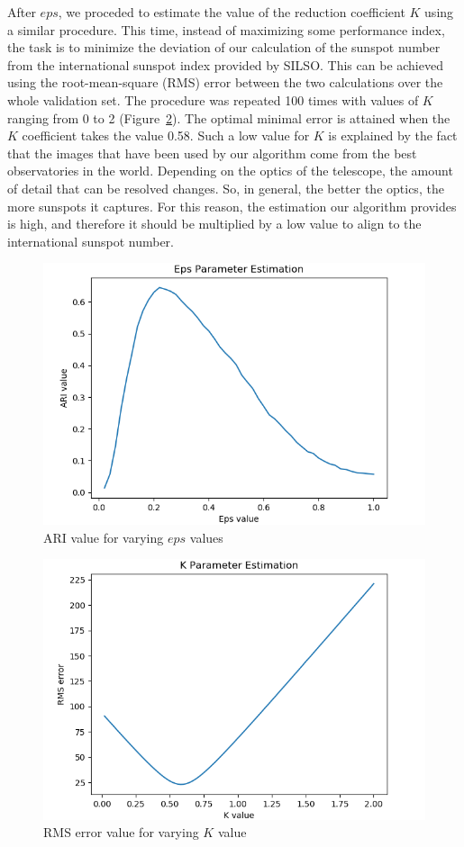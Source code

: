 \bigbreak
\noindent After $eps$, we proceded to estimate the value of the reduction coefficient $K$ using a similar procedure. This time, instead of maximizing some performance index, the task is to minimize the deviation of our calculation of the sunspot number from the international sunspot index provided by SILSO. This can be achieved using the root-mean-square (RMS) error between the two calculations over the whole validation set. The procedure was repeated 100 times with values of $K$ ranging from 0 to 2 (Figure~\ref{fig:k-rms}). The optimal minimal error is attained when the $K$ coefficient takes the value 0.58. Such a low value for $K$ is explained by the fact that the images that have been used by our algorithm come from the best observatories in the world. Depending on the optics of the telescope, the amount of detail that can be resolved changes. So, in general, the better the optics, the more sunspots it captures. For this reason, the estimation our algorithm provides is high, and therefore it should be multiplied by a low value to align to the international sunspot number.\clearpage
\begin{figure}[ht!]
  \centering
  \captionsetup{justification=centering}
  \includegraphics[width=\textwidth]{./pictures/eps-ari-copy}
  \caption{ARI value for varying $eps$ values}
  \label{fig:eps-ari}
\end{figure}
\begin{figure}[h!]
  \centering
  \captionsetup{justification=centering}
  \includegraphics[width=\textwidth]{./pictures/k-rms-copy}
  \caption{RMS error value for varying $K$ value}
  \label{fig:k-rms}
\end{figure}
